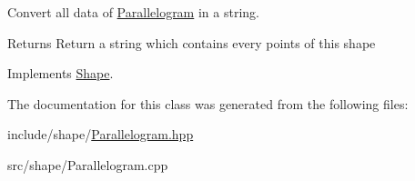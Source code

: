 Convert all data of \hyperlink{classParallelogram}{Parallelogram} in a string. 

\begin{DoxyReturn}{Returns}
Return a string which contains every points of this shape 
\end{DoxyReturn}


Implements \hyperlink{classShape_a98fa87c6dc4c7045fd6897a8f3bc186c}{Shape}.



The documentation for this class was generated from the following files\+:\begin{DoxyCompactItemize}
\item 
include/shape/\hyperlink{Parallelogram_8hpp}{Parallelogram.\+hpp}\item 
src/shape/Parallelogram.\+cpp\end{DoxyCompactItemize}

